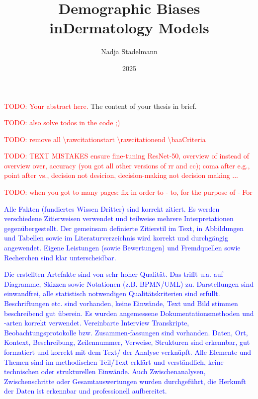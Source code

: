 \documentclass[12pt, a4paper, oneside]{book}   	%
\author{Nadja Stadelmann}                       %
\title{Demographic Biases in\linebreak Dermatology Models}   %
\subtitle{\large}               %
\date{2025}                                     %
\renewcommand{\todo}[1]{\textcolor{red}{TODO: #1}}
\newcommand{\baaCriteria}[1]{\textcolor{blue}{#1}}
\begin{document}
	\english                                        %
	\maketitle
	
	
	\begin{abstractstyle}{\hsummary}
		\todo{Your abstract here.}
	    The content of your thesis in brief.
	\end{abstractstyle}
	
	\tableofcontents
	
	\listoftodos
	\todo{also solve todos in the code ;)} 

	
	\todo{remove all \textbackslash rawcitationstart \textbackslash rawcitationend  \textbackslash baaCriteria}
	
	\todo{TEXT MISTAKES ensure fine-tuning ResNet-50, overview of instead of overview over, accuracy (you got all other versions of rr and cc); coma after e.g., point after vs., decision not desicion, decision-making not decision making ...}
	
	\todo{when you got to many pages: fix in order to - to, for the purpose of - For}
	
	
	\baaCriteria{Alle Fakten (fundiertes Wissen Dritter) sind korrekt zitiert. Es werden verschiedene Zitierweisen verwendet und teilweise mehrere Interpretationen gegenübergestellt. Der gemeinsam definierte Zitierstil im Text, in Abbildungen und Tabellen sowie im Literaturverzeichnis wird korrekt und durchgängig angewendet. Eigene Leistungen (sowie Bewertungen) und Fremdquellen sowie Recherchen sind klar unterscheidbar.} 
	
	
	\baaCriteria{Die erstellten Artefakte sind von sehr hoher Qualität. Das trifft u.a. auf Diagramme, Skizzen sowie Notationen (z.B. BPMN/UML) zu. Darstellungen sind einwandfrei, alle statistisch notwendigen Qualitätskriterien sind erfüllt. Beschriftungen etc. sind vorhanden, keine Einwände, Text und Bild stimmen beschreibend gut überein. Es wurden angemessene Dokumentationsmethoden und -arten korrekt verwendet. Vereinbarte Interview Transkripte, Beobachtungsprotokolle bzw. Zusammen-fassungen sind vorhanden. Daten, Ort, Kontext, Beschreibung, Zeilennummer, Verweise, Strukturen sind erkennbar, gut formatiert und korrekt mit dem Text/ der Analyse verknüpft. Alle Elemente und Themen sind im methodischen Teil/Text erklärt und verständlich, keine technischen oder strukturellen Einwände. Auch Zwischenanalysen, Zwischenschritte oder Gesamtauswertungen wurden durchgeführt, die Herkunft der Daten ist erkennbar und professionell aufbereitet.} 
	
\end{document}
